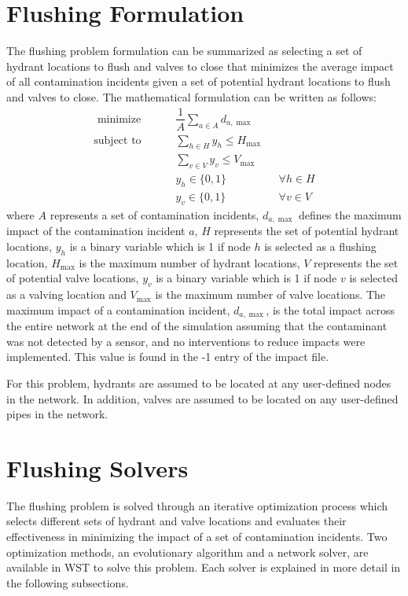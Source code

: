 \section{Flushing Formulation}\label{flushing_formulations}
The flushing problem formulation can be summarized 
as selecting a set of hydrant locations to flush and valves to close 
that minimizes the average impact of all contamination incidents 
given a set of potential hydrant locations to flush and valves to close. 
The mathematical formulation can be written as follows:
\begin{align}
\textrm{  minimize } \qquad &\dfrac{1}{A} \sum_{a \in {A}} d_{a,\max} \label{eqn:flushing} \\
\textrm{subject to } \qquad &\sum_{h\in H}y_{h} \leq H_{\max} \label{eq:flushing_2} \\
&\sum_{v\in V}y_{v} \leq V_{\max} \label{eq:flushing_3} \\  
&y_{h} \in \{0,1\} &&\forall h\in H \label{eq:flushing_4} \\
&y_{v} \in \{0,1\} &&\forall v\in V \label{eq:flushing_5}
\end{align}
where $A$ represents a set of contamination incidents, 
$d_{a,\max}$ defines the maximum impact of the contamination incident $a$, 
$H$ represents the set of potential hydrant locations,
$y_h$ is a binary variable which is 1 if node $h$ is selected as a flushing location, 
$H_{\max}$ is the maximum number of hydrant locations,
$V$ represents the set of potential valve locations,
$y_v$ is a binary variable which is 1 if node $v$ is selected as a valving location and 
$V_{\max}$ is the maximum number of valve locations. The maximum impact of a contamination
incident, $d_{a,\max}$, is the total impact across the entire network at the end of the simulation 
assuming that the contaminant was not detected by a sensor, and no interventions to reduce 
impacts were implemented. This value is found in the -1 entry of the impact file. 

For this problem, hydrants are assumed to be located at any user-defined nodes in the network. 
In addition, valves are assumed to be located on any user-defined pipes in the network.  

\section{Flushing Solvers}\label{flushing_solvers}
The flushing problem is solved through an iterative optimization process which 
selects different sets of hydrant and valve locations and evaluates their effectiveness
in minimizing the impact of a set of contamination incidents. Two optimization 
methods, an evolutionary algorithm and a network solver, are available in WST to solve this problem. 
Each solver is explained in more detail in the following subsections. 

